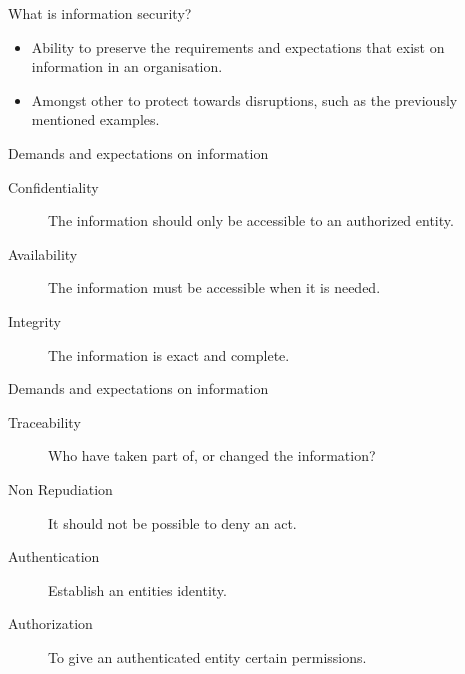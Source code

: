 \documentclass{beamer}
\begin{document}
\begin{frame}{What is information security?}
  \begin{itemize}
    \item Ability to preserve the requirements and expectations that exist on
      information in an organisation.
    \item Amongst other to protect towards disruptions, such as the previously
      mentioned examples.
  \end{itemize}
\end{frame}

\begin{frame}{Demands and expectations on information}
  \begin{description}
    \item[Confidentiality] The information should only be accessible to an
      authorized entity.

    \item[Availability] The information must be accessible when it is needed.

    \item[Integrity] The information is exact and complete.

  \end{description}
\end{frame}

\begin{frame}{Demands and expectations on information}
  \begin{description}
    \item[Traceability] Who have taken part of, or changed the information?
    \item[Non Repudiation] It should not be possible to deny an act.
    \item[Authentication] Establish an entities identity.
    \item[Authorization] To give an authenticated entity certain permissions.
  \end{description}
\end{frame}
\end{document}
